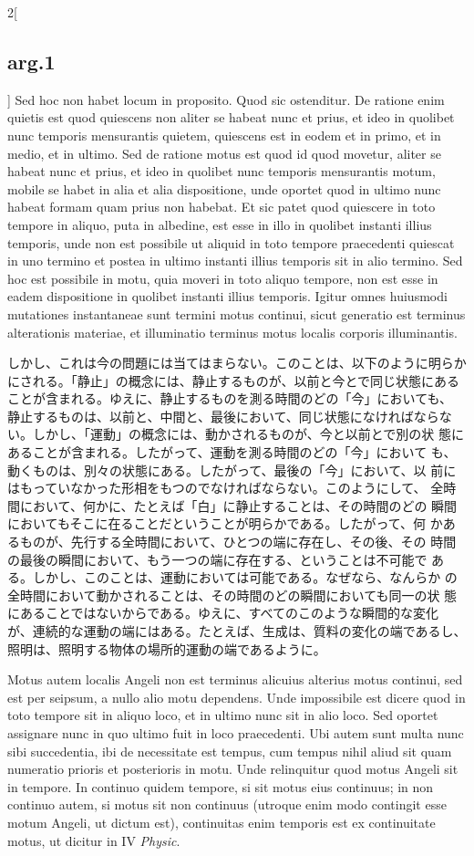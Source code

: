 \documentclass[paper=a4paper,fontsize=10pt,jafontsize=9pt,titlepage]{jlreq}
\begin{document}
\begin{paracol}{2}[\subsection{arg.1}]
Sed hoc non habet locum in
proposito. Quod sic ostenditur. De ratione enim quietis est quod
quiescens non aliter se habeat nunc et prius, et ideo in quolibet nunc
temporis mensurantis quietem, quiescens est in eodem et in primo, et in
medio, et in ultimo. Sed de ratione motus est quod id quod movetur,
aliter se habeat nunc et prius, et ideo in quolibet nunc temporis
mensurantis motum, mobile se habet in alia et alia dispositione, unde
oportet quod in ultimo nunc habeat formam quam prius non habebat. Et sic
patet quod quiescere in toto tempore in aliquo, puta in albedine, est
esse in illo in quolibet instanti illius temporis, unde non est
possibile ut aliquid in toto tempore praecedenti quiescat in uno termino
et postea in ultimo instanti illius temporis sit in alio termino. Sed
hoc est possibile in motu, quia moveri in toto aliquo tempore, non est
esse in eadem dispositione in quolibet instanti illius temporis. Igitur
omnes huiusmodi mutationes instantaneae sunt termini motus continui,
sicut generatio est terminus alterationis materiae, et illuminatio
terminus motus localis corporis illuminantis.

\switchcolumn

しかし、これは今の問題には当てはまらない。このことは、以下のように明らか
 にされる。「静止」の概念には、静止するものが、以前と今とで同じ状態にある
 ことが含まれる。ゆえに、静止するものを測る時間のどの「今」においても、
 静止するものは、以前と、中間と、最後において、同じ状態になければならな
 い。しかし、「運動」の概念には、動かされるものが、今と以前とで別の状
 態にあることが含まれる。したがって、運動を測る時間のどの「今」において
 も、動くものは、別々の状態にある。したがって、最後の「今」において、以
 前にはもっていなかった形相をもつのでなければならない。このようにして、
 全時間において、何かに、たとえば「白」に静止することは、その時間のどの
 瞬間においてもそこに在ることだということが明らかである。したがって、何
 かあるものが、先行する全時間において、ひとつの端に存在し、その後、その
 時間の最後の瞬間において、もう一つの端に存在する、ということは不可能で
 ある。しかし、このことは、運動においては可能である。なぜなら、なんらか
 の全時間において動かされることは、その時間のどの瞬間においても同一の状
 態にあることではないからである。ゆえに、すべてのこのような瞬間的な変化
 が、連続的な運動の端にはある。たとえば、生成は、質料の変化の端であるし、
 照明は、照明する物体の場所的運動の端であるように。

\switchcolumn*

Motus autem localis Angeli
non est terminus alicuius alterius motus continui, sed est per seipsum,
a nullo alio motu dependens. Unde impossibile est dicere quod in toto
tempore sit in aliquo loco, et in ultimo nunc sit in alio loco. Sed
oportet assignare nunc in quo ultimo fuit in loco praecedenti. Ubi autem
sunt multa nunc sibi succedentia, ibi de necessitate est tempus, cum
tempus nihil aliud sit quam numeratio prioris et posterioris in
motu. Unde relinquitur quod motus Angeli sit in tempore. In continuo
quidem tempore, si sit motus eius continuus; in non continuo autem, si
motus sit non continuus (utroque enim modo contingit esse motum Angeli,
ut dictum est), continuitas enim temporis est ex continuitate motus, ut
dicitur in IV {\itshape Physic}.


\end{paracol}
\end{document}
